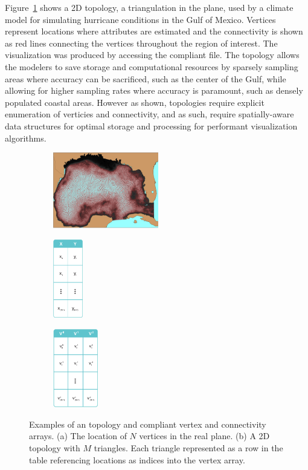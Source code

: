 Figure~\ref{fig:usf_fvcom_ugrid} shows a \ugrid{} 2D topology, a
triangulation in the plane, used by a climate model for simulating
hurricane conditions in the Gulf of Mexico. Vertices represent
locations where attributes are estimated and the connectivity is shown
as red lines connecting the vertices throughout the region of
interest. The visualization was produced by accessing the \cfugrid{}
compliant \ncml{} file. The \ugrid{} topology allows the modelers to
save storage and computational resources by sparsely sampling areas
where accuracy can be sacrificed, such as the center of the Gulf,
while allowing for higher sampling rates where accuracy is paramount,
such as densely populated coastal areas. However as shown, \ugrid{}
topologies require explicit enumeration of verticies and connectivity,
and as such, require spatially-aware data structures for optimal
storage and processing for performant visualization algorithms.

\begin{figure}
  \centering
  \begin{subfigure}[t]{0.33\textwidth}
    \centering
    \includegraphics[height=1.3in]{../figs/USF_FVCOM_Hurricane_Ike_2D_final_run_with_waves_topology.png}
    \caption{}
    \label{fig:usf_fvcom_ugrid}
  \end{subfigure}
  \begin{subfigure}[t]{0.32\textwidth}
    \centering
    \includegraphics[height=1.35in]{../figs/xy_table}
    \caption{}
    \label{fig:xytable}
  \end{subfigure}
  \begin{subfigure}[t]{0.32\textwidth}
    \centering
    \includegraphics[height=1.35in]{../figs/v_table}
    \caption{}
    \label{fig:vtable}
  \end{subfigure}
  \caption{Examples of an \ugrid{} topology and \cfugrid compliant
    vertex and connectivity arrays. (a) The location of $N$
    vertices in the real plane. (b) A 2D topology with
    $M$ triangles. Each triangle represented as a row in the table
    referencing locations as indices into the vertex array.}
\end{figure}
